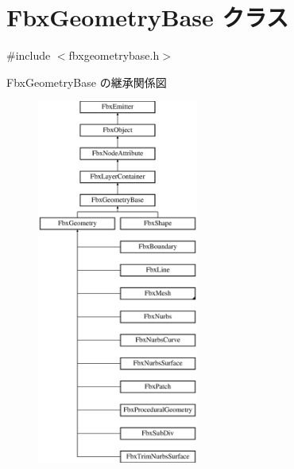 \hypertarget{class_fbx_geometry_base}{}\section{Fbx\+Geometry\+Base クラス}
\label{class_fbx_geometry_base}


{\ttfamily \#include $<$fbxgeometrybase.\+h$>$}

Fbx\+Geometry\+Base の継承関係図\begin{figure}[H]
\begin{center}
\leavevmode
\includegraphics[height=12.000000cm]{class_fbx_geometry_base}
\end{center}
\end{figure}
